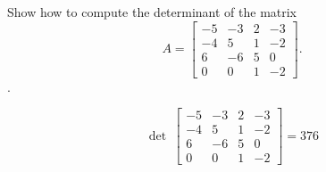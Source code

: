 
\begin{exerciseStatement}


Show how to compute the determinant of the matrix \[A= \left[\begin{array}{cccc}
-5 & -3 & 2 & -3 \\
-4 & 5 & 1 & -2 \\
6 & -6 & 5 & 0 \\
0 & 0 & 1 & -2
\end{array}\right] .\].


\end{exerciseStatement}
    
\begin{exerciseAnswer} 
\[\operatorname{det}\  \left[\begin{array}{cccc}
-5 & -3 & 2 & -3 \\
-4 & 5 & 1 & -2 \\
6 & -6 & 5 & 0 \\
0 & 0 & 1 & -2
\end{array}\right] = 376 \]
\end{exerciseAnswer}
    
